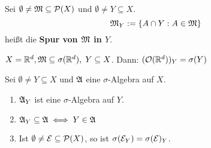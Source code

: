 \begin{definition}
    Sei $\emptyset \neq \mathfrak{M} \subseteq \mathcal{P}(X)$ und 
    $\emptyset \neq Y \subseteq X$. 
    \[\mathfrak{M}_Y := \{A \cap Y : A \in \mathfrak{M}\}\] 
    heißt die \textbf{Spur von $\mathfrak{M}$ in $Y$}.
\end{definition}

\begin{beispiel}
    $X = \mathbb{R}^d, \mathfrak{M} \subseteq \sigma(\mathbb{R}^d), \; Y \subseteq X$. 
    Dann: $(\mathcal{O}(\mathbb{R}^d))_Y = \sigma(Y)$
\end{beispiel}

\begin{satz}
    \label{Satz 1.5}
    Sei $\emptyset \neq Y \subseteq X$ und $\mathfrak{A}$ eine 
    $\sigma$-Algebra auf $X$.
    \begin{enumerate}
        \item $\mathfrak{A}_Y$ ist eine $\sigma$-Algebra auf $Y$.
        \item $\mathfrak{A}_Y \subseteq \mathfrak{A} \iff Y \in \mathfrak{A}$
        \item Ist $\emptyset \neq \mathcal{E} \subseteq \mathcal{P}(X)$, so 
              ist $\sigma(\mathcal{E}_Y) = \sigma(\mathcal{E})_Y$.
    \end{enumerate}
\end{satz}

